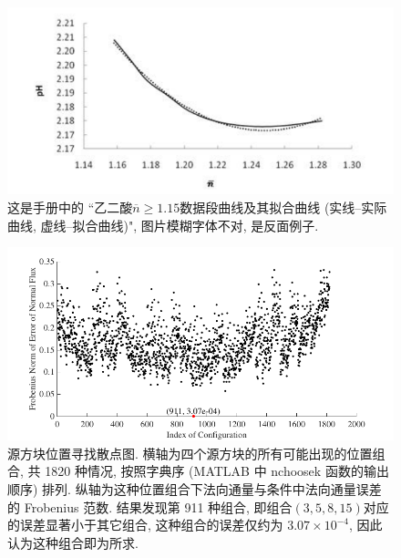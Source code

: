 \begin{figure}[htbp]
  \centering
  \includegraphics{figures/oxalic-acid-n-geq-1.15.pdf}
  \caption{这是手册中的 ``乙二酸$\overline{n}\geq 1.15$数据段曲线及其拟合曲线 (实线--实际曲线, 虚线--拟合曲线)", 图片模糊字体不对, 是反面例子.}\label{fig:xlccd-single}
\end{figure}

\begin{figure}[htbp]
  \centering
  \includegraphics{figures/source-block-find-position.pdf}
  \caption{源方块位置寻找散点图. 横轴为四个源方块的所有可能出现的位置组合, 共 1820 种情况, 按照字典序 (MATLAB 中 nchoosek 函数的输出顺序) 排列. 纵轴为这种位置组合下法向通量与条件中法向通量误差的 Frobenius 范数. 结果发现第 911 种组合, 即组合$(3, 5, 8, 15)$对应的误差显著小于其它组合, 这种组合的误差仅约为 $3.07\times 10^{-4}$, 因此认为这种组合即为所求.}\label{fig:sb-fp}
\end{figure}

